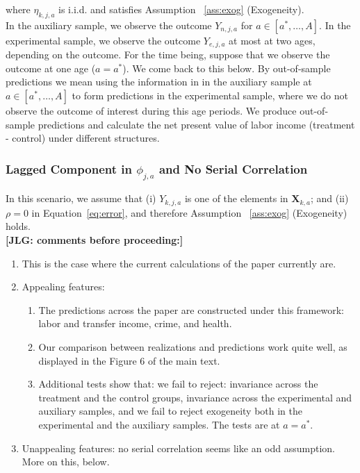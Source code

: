 \noindent where $\eta_{k,j,{a}}$ is i.i.d. and satisfies Assumption ~\ref{ass:exog} (Exogeneity).\\ 

\noindent In the auxiliary sample, we observe the outcome $Y_{n,j,a}$ for $a \in [a^*, \ldots, A]$. In the experimental sample, we observe the outcome $Y_{e,j,a}$ at most at two ages, depending on the outcome. For the time being, suppose that we observe the outcome at one age ($a = a^*$). We come back to this below. By out-of-sample predictions we mean using the information in in the auxiliary sample at  $a \in [a^*, \ldots, A]$ to form predictions in the experimental sample, where we do not observe the outcome of interest during this age periods. We produce out-of-sample predictions and calculate the net present value of labor income (treatment - control) under different structures.\\ 

\subsubsection{Lagged Component in $\phi_{j,a}$ and No Serial Correlation}

\noindent In this scenario, we assume that (i)  $Y_{k,j,a}$ is one of the elements in $\bm{X}_{k,a}$; and (ii) $\rho = 0$ in Equation~\eqref{eq:error}, and therefore Assumption ~\ref{ass:exog} (Exogeneity) holds.\\

\noindent \textbf{[JLG: comments before proceeding:]}

\begin{enumerate}
 
\item This is the case where the current calculations of the paper currently are.
\item Appealing features:

\begin{enumerate}
\item The predictions across the paper are constructed under this framework: labor and transfer income, crime, and health. 
\item Our comparison between realizations and predictions work quite well, as displayed in the Figure 6 of the main text. 
\item Additional tests show that: we fail to reject: invariance across the treatment and the control groups, invariance across the experimental and auxiliary samples, and we fail to reject exogeneity both in the experimental and the auxiliary samples.  The tests are at $a = a^*$.

\end{enumerate}
\item Unappealing features: no serial correlation seems like an odd assumption. More on this, below.
\end{enumerate}

